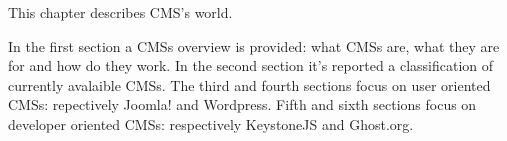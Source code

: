 This chapter describes CMS's world.

In the first section a CMSs overview is provided: what CMSs are, what they are for and how do they work. In the second section it's reported a classification of currently avalaible CMSs. The third and fourth sections focus on user oriented CMSs: repectively Joomla! and Wordpress. Fifth and sixth sections focus on developer oriented CMSs: respectively KeystoneJS and Ghost.org.